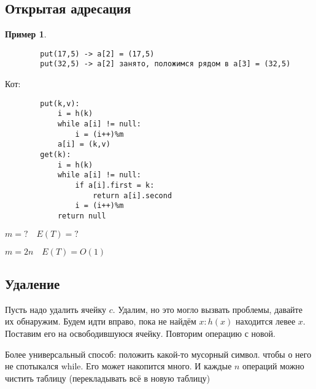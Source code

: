 \documentclass{book}
\theoremstyle{definition}
\newtheorem*{example}{Пример}
\begin{document}
\subsection{Открытая адресация}

\begin{example}
    \begin{verbatim}
        put(17,5) -> a[2] = (17,5)
        put(32,5) -> a[2] занято, положимся рядом в a[3] = (32,5)
    \end{verbatim}

    Кот:
    \begin{verbatim}
        put(k,v):
            i = h(k)
            while a[i] != null:
                i = (i++)%m 
            a[i] = (k,v)
        get(k):
            i = h(k)
            while a[i] != null:
                if a[i].first = k:
                    return a[i].second
                i = (i++)%m
            return null
    \end{verbatim}

    $m = ?\quad E(T) = ?$

    $m=2n\quad E(T) = O(1)$
\end{example}

\subsection{Удаление}

Пусть надо удалить ячейку $c$. Удалим, но это могло вызвать проблемы, давайте их обнаружим. Будем идти вправо, пока не найдём  $x:h(x)$ находится левее  $x$. Поставим его на освободившуюся ячейку. Повторим операцию с новой.

Более универсальный способ: положить какой-то мусорный символ. чтобы о него не спотыкался while. Его может накопится много. И каждые $n$ операций можно чистить таблицу (перекладывать всё в новую таблицу)
\end{document}
